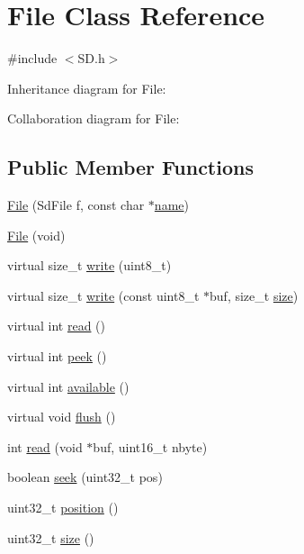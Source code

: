 \hypertarget{class_file}{}\section{File Class Reference}
\label{class_file}


{\ttfamily \#include $<$S\+D.\+h$>$}



Inheritance diagram for File\+:


Collaboration diagram for File\+:
\subsection*{Public Member Functions}
\begin{DoxyCompactItemize}
\item 
\hyperlink{class_file_ad34490d697d9e56859f566534b360c54}{File} (Sd\+File f, const char $\ast$\hyperlink{class_file_a7dc80cb96e6062652690a42b584f230e}{name})
\item 
\hyperlink{class_file_a7dcb21db9e1623e84b9c3dee81c12617}{File} (void)
\item 
virtual size\+\_\+t \hyperlink{class_file_acee911dcb9057b964fd5b3ce888a934b}{write} (uint8\+\_\+t)
\item 
virtual size\+\_\+t \hyperlink{class_file_aa531c1641a2363e1f6b9d103f37433da}{write} (const uint8\+\_\+t $\ast$buf, size\+\_\+t \hyperlink{class_file_a603d3cd3319142d00a7ebd434970b017}{size})
\item 
virtual int \hyperlink{class_file_a4c46a1975e66c37977bf07c58ec10b4e}{read} ()
\item 
virtual int \hyperlink{class_file_a0e5025f39bd584563bfe4b05fc1db268}{peek} ()
\item 
virtual int \hyperlink{class_file_acf613c4e75bae85f543b30e701ebcc44}{available} ()
\item 
virtual void \hyperlink{class_file_af87fa862de707575b8badd044a5af80e}{flush} ()
\item 
int \hyperlink{class_file_a30539792f063f24ee5ee7c11dfa564b2}{read} (void $\ast$buf, uint16\+\_\+t nbyte)
\item 
boolean \hyperlink{class_file_a2a46cc148ddc53fe5170164227a695ae}{seek} (uint32\+\_\+t pos)
\item 
uint32\+\_\+t \hyperlink{class_file_aae991c597c0bc4c5eb44c1f3b06a21ec}{position} ()
\item 
uint32\+\_\+t \hyperlink{class_file_a603d3cd3319142d00a7ebd434970b017}{size} ()
\item 

\end{DoxyCompactItemize}

